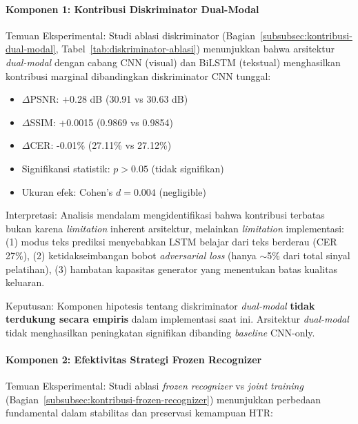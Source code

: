 \documentclass[12pt,a4paper]{article}
\begin{document}
\paragraph{Komponen 1: Kontribusi Diskriminator Dual-Modal}

Temuan Eksperimental: Studi ablasi diskriminator (Bagian~\ref{subsubsec:kontribusi-dual-modal}, Tabel~\ref{tab:diskriminator-ablasi}) menunjukkan bahwa arsitektur \textit{dual-modal} dengan cabang CNN (visual) dan BiLSTM (tekstual) menghasilkan kontribusi marginal dibandingkan diskriminator CNN tunggal:

\begin{itemize}[nosep]
    \item $\Delta$PSNR: +0.28 dB (30.91 vs 30.63 dB)
    \item $\Delta$SSIM: +0.0015 (0.9869 vs 0.9854)
    \item $\Delta$CER: -0.01\% (27.11\% vs 27.12\%)
    \item Signifikansi statistik: $p > 0.05$ (tidak signifikan)
    \item Ukuran efek: Cohen's $d = 0.004$ (negligible)
\end{itemize}

Interpretasi: Analisis mendalam mengidentifikasi bahwa kontribusi terbatas bukan karena \textit{limitation} inherent arsitektur, melainkan \textit{limitation} implementasi: (1) modus teks prediksi menyebabkan LSTM belajar dari teks berderau (CER 27\%), (2) ketidakseimbangan bobot \textit{adversarial loss} (hanya $\sim$5\% dari total sinyal pelatihan), (3) hambatan kapasitas generator yang menentukan batas kualitas keluaran.

Keputusan: Komponen hipotesis tentang diskriminator \textit{dual-modal} \textbf{tidak terdukung secara empiris} dalam implementasi saat ini. Arsitektur \textit{dual-modal} tidak menghasilkan peningkatan signifikan dibanding \textit{baseline} CNN-only.

\vspace{0.5em}

\paragraph{Komponen 2: Efektivitas Strategi Frozen Recognizer}

Temuan Eksperimental: Studi ablasi \textit{frozen recognizer} vs \textit{joint training} (Bagian~\ref{subsubsec:kontribusi-frozen-recognizer}) menunjukkan perbedaan fundamental dalam stabilitas dan preservasi kemampuan HTR:
\end{document}
